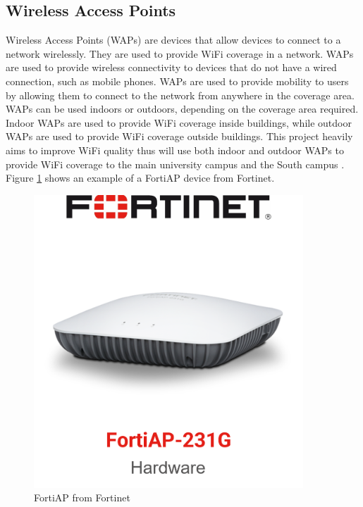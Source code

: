 \documentclass[12pt]{report}
\begin{document}
\subsection{Wireless Access Points}
Wireless Access Points (WAPs) are devices that allow devices to connect to a network wirelessly. They are used to provide WiFi coverage in a network. WAPs are used to provide wireless connectivity to devices that do not have a wired connection, such as mobile phones. WAPs are used to provide mobility to users by allowing them to connect to the network from anywhere in the coverage area. WAPs can be used indoors or outdoors, depending on the coverage area required. Indoor WAPs are used to provide WiFi coverage inside buildings, while outdoor WAPs are used to provide WiFi coverage outside buildings. This project heavily aims to improve WiFi quality thus will use both indoor and outdoor WAPs to provide WiFi coverage to the main university campus and the South campus \cite{FortiAP}.
Figure \ref{fig:FortiAP} shows an example of a FortiAP device from Fortinet. 
\begin{figure}[h]
    \centering
    \includegraphics[width=0.9\textwidth]{images/AP.png}
    \caption{FortiAP from Fortinet \cite{FAPIMG}}
    \label{fig:FortiAP}
\end{figure}
\end{document}
